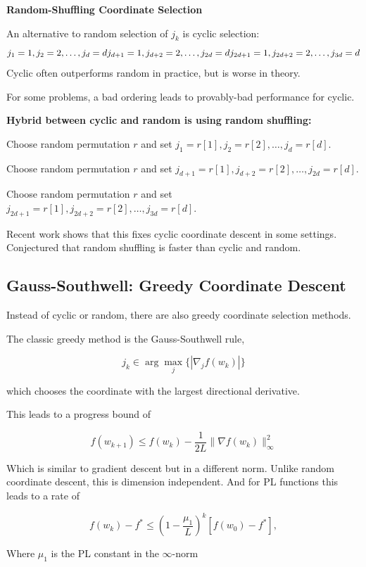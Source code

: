 \documentclass[
]{article}
\begin{document}
\textbf{Random-Shuffling Coordinate Selection}

An alternative to random selection of \(j_k\) is cyclic selection:
\[
j_1 = 1, j_2 = 2, \ldots, j_d = d \\
j_{d+1} = 1, j_{d+2} = 2, \ldots, j_{2d} = d \\
j_{2d+1} = 1, j_{2d+2} = 2, \ldots, j_{3d} = d \\
\]
Cyclic often outperforms random in practice, but is worse in theory.

For some problems, a bad ordering leads to provably-bad performance for cyclic.

\textbf{Hybrid between cyclic and random is using random shuffling:}

Choose random permutation \(r\) and set \(j_1 = r[1], j_2 = r[2], \ldots, j_d = r[d]\).

Choose random permutation \(r\) and set \(j_{d+1} = r[1], j_{d+2} = r[2], \ldots, j_{2d} = r[d]\).

Choose random permutation \(r\) and set \(j_{2d+1} = r[1], j_{2d+2} = r[2], \ldots, j_{3d} = r[d]\).

Recent work shows that this fixes cyclic coordinate descent in some settings. Conjectured that random shuffling is faster than cyclic and random.

\subsection{Gauss-Southwell: Greedy Coordinate Descent}\label{gauss-southwell-greedy-coordinate-descent}

Instead of cyclic or random, there are also greedy coordinate selection methods.

The classic greedy method is the Gauss-Southwell rule,

\[
j_k \in \arg\max_j \{|\nabla_j f(w_k)|\}
\]

which chooses the coordinate with the largest directional derivative.

This leads to a progress bound of

\[
f(w_{k+1}) \leq f(w_k) - \frac{1}{2L} \|\nabla f(w_k)\|^2_\infty
\]

Which is similar to gradient descent but in a different norm. Unlike random coordinate descent, this is dimension independent. And for PL functions this leads to a rate of

\[ f(w_k) - f^* \leq \left( 1 - \frac{\mu_1}{L} \right)^k [f(w_0) - f^*], \]

Where \(\mu_1\) is the PL constant in the \(\infty\)-norm
\end{document}
